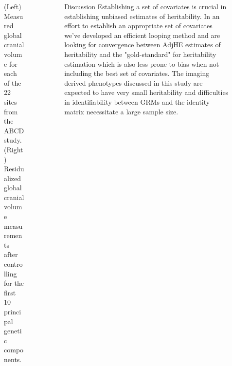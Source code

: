 \documentclass[final]{beamer}
\newlength{\sepwid}
\newlength{\onecolwid}
\newlength{\twocolwid}
\begin{document}
\begin{frame}[t]
\begin{columns}[t]
\begin{column}{\twocolwid}
\begin{figure}
\begin{minipage}[c]{0.67\textwidth}
  \end{minipage}\hfill
  \begin{minipage}[c]{0.3\textwidth}
    \caption{\centering
       (Left) Measured global cranial volume for each of the 22 sites from the ABCD study. (Right) Residualized global cranial volume measurements after controlling for the first 10 principal genetic components.
    } \label{fig:03-03}
  \end{minipage}
\end{figure}

\end{column} %
\begin{column}{\sepwid}\end{column} %
\begin{column}{\onecolwid} %
\begin{block}{Discussion}
Establishing a set of covariates is crucial in establishing unbiased estimates of heritability. In an effort to establish an appropriate set of covariates we've developed an efficient looping method and are looking for convergence between AdjHE estimates of heritability and the "gold-standard" for heritability estimation which is also less prone to bias when not including the best set of covariates. The imaging derived phenotypes discussed in this study are expected to have very small heritability and difficulties in identifiability between GRMs and the identity matrix necessitate a large sample size. 
\end{block}


\end{column}
\end{columns}
\end{frame}
\end{document}
